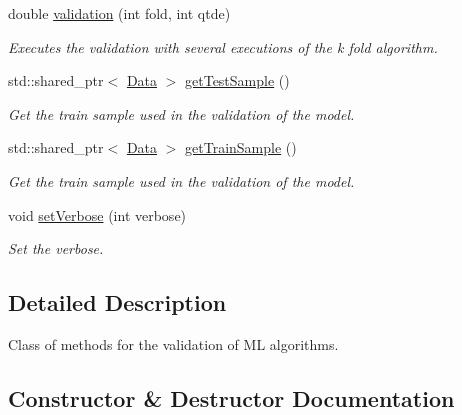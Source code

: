 \begin{DoxyCompactItemize}
double \hyperlink{class_validation_a8d4b505b7e85e1fc9c90515ad3454977}{validation} (int fold, int qtde)
\begin{DoxyCompactList}\small\item\em Executes the validation with several executions of the k fold algorithm. \end{DoxyCompactList}\item 
std\+::shared\+\_\+ptr$<$ \hyperlink{class_data}{Data} $>$ \hyperlink{class_validation_a704c7a3da9a17f2a4fd28e02640256be}{get\+Test\+Sample} ()
\begin{DoxyCompactList}\small\item\em Get the train sample used in the validation of the model. \end{DoxyCompactList}\item 
std\+::shared\+\_\+ptr$<$ \hyperlink{class_data}{Data} $>$ \hyperlink{class_validation_ae31ccc41bcfe7e3269cde8bed2ed4cc9}{get\+Train\+Sample} ()
\begin{DoxyCompactList}\small\item\em Get the train sample used in the validation of the model. \end{DoxyCompactList}\item 
void \hyperlink{class_validation_ac402fbabbd6148d7c2ac0c7c9a854177}{set\+Verbose} (int verbose)
\begin{DoxyCompactList}\small\item\em Set the verbose. \end{DoxyCompactList}\end{DoxyCompactItemize}


\subsection{Detailed Description}
Class of methods for the validation of ML algorithms. 

\subsection{Constructor \& Destructor Documentation}
\mbox{\label{class_validation_abc3509e1641aa9fadf3bcdf3df368b2f}} 
